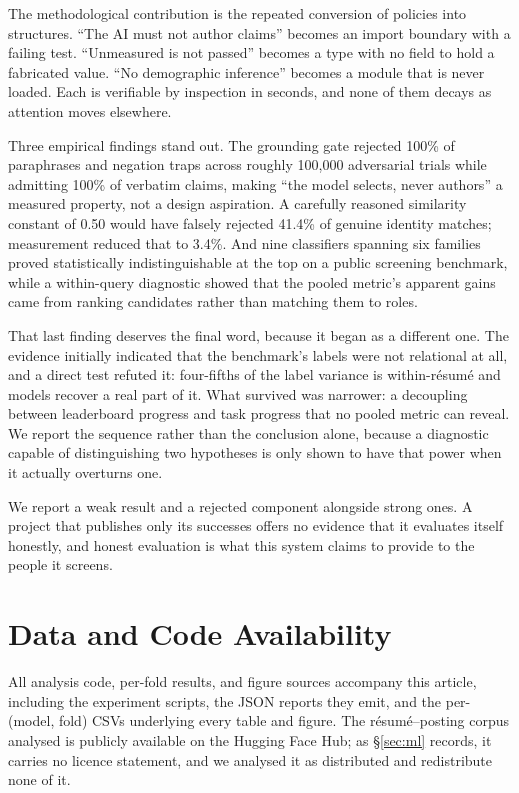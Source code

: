 The methodological contribution is the repeated conversion of policies into
structures. ``The AI must not author claims'' becomes an import boundary with a
failing test. ``Unmeasured is not passed'' becomes a type with no field to hold a
fabricated value. ``No demographic inference'' becomes a module that is never
loaded. Each is verifiable by inspection in seconds, and none of them decays as attention moves elsewhere.

Three empirical findings stand out. The grounding gate rejected 100\% of
paraphrases and negation traps across roughly 100{,}000 adversarial trials while
admitting 100\% of verbatim claims, making ``the model selects, never authors'' a measured property, not a design aspiration. A carefully reasoned
similarity constant of 0.50 would have falsely rejected 41.4\% of genuine
identity matches; measurement reduced that to 3.4\%. And nine classifiers
spanning six families proved statistically indistinguishable at the top on a
public screening benchmark, while a within-query diagnostic showed that the
pooled metric's apparent gains came from ranking candidates rather than matching
them to roles.

That last finding deserves the final word, because it began as a different one.
The evidence initially indicated that the benchmark's labels were not relational
at all, and a direct test refuted it: four-fifths of the label variance is
within-résumé and models recover a real part of it. What survived was narrower: a decoupling between leaderboard progress and task progress that no pooled metric can reveal. We report the sequence rather than the conclusion alone,
because a diagnostic capable of distinguishing two hypotheses is only shown to
have that power when it actually overturns one.

We report a weak result and a rejected component alongside strong ones. A project
that publishes only its successes offers no evidence that it evaluates itself
honestly, and honest evaluation is what this system claims to provide to the
people it screens.

\section*{Data and Code Availability}

All analysis code, per-fold results, and figure sources accompany this article,
including the experiment scripts, the JSON reports they emit, and the
per-(model, fold) CSVs underlying every table and figure. The résumé--posting
corpus analysed is publicly available on the Hugging Face Hub; as
\S\ref{sec:ml} records, it carries no licence statement, and we analysed it as
distributed and redistribute none of it.

